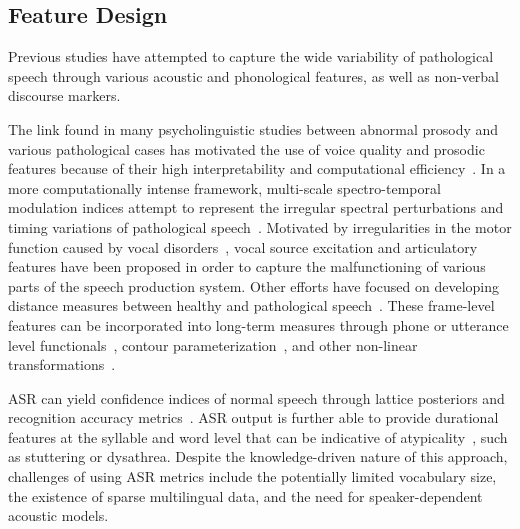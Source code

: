 \documentclass{article}
\begin{document}
\subsection{Feature Design}
Previous studies have attempted to capture the wide variability of pathological speech through various acoustic and phonological features, as well as non-verbal discourse markers.


The link found in many psycholinguistic studies between abnormal prosody and various pathological cases has motivated the use of voice quality and prosodic features because of their high interpretability and computational efficiency~\cite{van2010computational,tsanas2012novel,bone2014psychologist}. In a more computationally intense framework, multi-scale spectro-temporal modulation indices attempt to represent the irregular spectral perturbations and timing variations of pathological speech~\cite{liss2010discriminating,falk2012characterization,williamson2015automatic}. Motivated by irregularities in the motor function caused by vocal disorders~\cite{falk2012characterization,hahm2015parkinson}, vocal source excitation and articulatory features have been proposed in order to capture the malfunctioning of various parts of the speech production system. Other efforts have focused on developing distance measures between healthy and pathological speech~\cite{gu2005disordered}. These frame-level features can be incorporated into long-term measures through phone or utterance level functionals~\cite{kim2015automatic}, contour parameterization~\cite{kim2015automatic2}, and other non-linear transformations~\cite{kim2015automatic,an2015automatic,middag2011combining}.

ASR can yield confidence indices of normal speech through lattice posteriors and recognition accuracy metrics~\cite{kim2015automatic,zlotnik2015random,maier2009peaks,sharma2009universal,middag2009automated}. ASR output is further able to provide durational features at the syllable and word level that can be indicative of atypicality~\cite{an2015automatic,duez2006consonant}, such as stuttering or dysathrea. Despite the knowledge-driven nature of this approach, challenges of using ASR metrics include the potentially limited vocabulary size, the existence of sparse multilingual data, and the need for speaker-dependent acoustic models.
\end{document}
